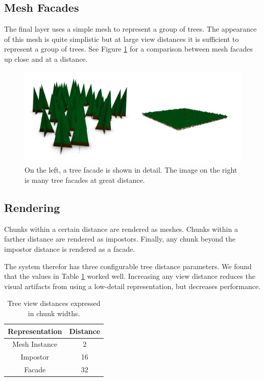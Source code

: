 \subsection{Mesh Facades}

The final layer uses a simple mesh to represent a group of trees.
The appearance of this mesh is quite simplistic but at large view distances it is sufficient to represent a group of trees.
See Figure \ref{fig:tree_facades} for a comparison between mesh facades up close and at a distance.

\begin{figure}
	\centering
		\includegraphics[width=1.0\textwidth]{figures/tree_facades.jpg}
	\caption{
		On the left, a tree facade is shown in detail.
		The image on the right is many tree facades at great distance.
	}
	\label{fig:tree_facades}
\end{figure}

\subsection{Rendering}

Chunks within a certain distance are rendered as meshes.
Chunks within a farther distance are rendered as impostors.
Finally, any chunk beyond the impostor distance is rendered as a facade.

The system therefor has three configurable tree distance parameters.
We found that the values in Table \ref{tab:tree_distance} worked well.
Increasing any view distance reduces the visual artifacts from using a low-detail representation, but decreases performance.

\begin{table}
	\centering
	\begin{tabular}{ || c | c || }
		\hline
		Representation & Distance \\ [0.5ex]
		\hline\hline
		Mesh Instance & 2 \\
		\hline
		Impostor & 16 \\
		\hline
		Facade & 32 \\
		\hline
	\end{tabular}
	\caption{Tree view distances expressed in chunk widths.}
	\label{tab:tree_distance}
\end{table}

